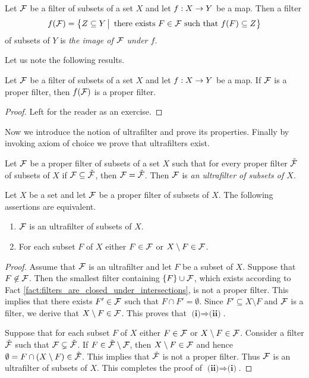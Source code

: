 \begin{definition}
Let ${\mathcal F}$ be a filter of subsets of a set $X$ and let $f:X\rightarrow Y$ be a map. Then a filter
$$f({\mathcal F}) = \big\{Z \subseteq Y\,\big|\,\mbox{ there exists }F\in {\mathcal F}\mbox{ such that }f(F)\subseteq Z\big\}$$
of subsets of $Y$ is \textit{the image of ${\mathcal F}$ under $f$}.
\end{definition}
\noindent
Let us note the following results.

\begin{fact}\label{fact:image_of_a_proper_filter_is_proper}
Let ${\mathcal F}$ be a filter of subsets of a set $X$ and let $f:X\rightarrow Y$ be a map. If ${\mathcal F}$ is a proper filter, then $f({\mathcal F})$ is a proper filter.
\end{fact}
\begin{proof}
Left for the reader as an exercise.
\end{proof}
\noindent
Now we introduce the notion of ultrafilter and prove its properties. Finally by invoking axiom of choice we prove that ultrafilters exist.

\begin{definition}
Let ${\mathcal F}$ be a proper filter of subsets of a set $X$ such that for every proper filter $\tilde{{\mathcal F}}$ of subsets of $X$ if ${\mathcal F} \subseteq \tilde{{\mathcal F}}$, then ${\mathcal F} = \tilde{{\mathcal F}}$. Then ${\mathcal F}$ is \textit{an ultrafilter of subsets of $X$}.
\end{definition}

\begin{proposition}\label{proposition:ultrafilter_contains_either_susbet_or_its_complement}
Let $X$ be a set and let ${\mathcal F}$ be a proper filter of subsets of $X$. The following assertions are equivalent.
\begin{enumerate}[label=\emph{\textbf{(\roman*)}}, leftmargin=*]
\item ${\mathcal F}$ is an ultrafilter of subsets of $X$.
\item For each subset $F$ of $X$ either $F \in {\mathcal F}$ or $X\setminus F \in {\mathcal F}$.
\end{enumerate}
\end{proposition}
\begin{proof}
Assume that ${\mathcal F}$ is an ultrafilter and let $F$ be a subset of $X$. Suppose that $F\not \in {\mathcal F}$. Then the smallest filter containing $\{F\}\cup {\mathcal F}$, which exists according to Fact \ref{fact:filters_are_closed_under_intersections}, is not a proper filter. This implies that there exists $F' \in {\mathcal F}$ such that $F\cap F' = \emptyset$. Since $F'\subseteq X\setminus F$ and ${\mathcal F}$ is a filter, we derive that $X\setminus F \in {\mathcal F}$. This proves that $\textbf{(i)}\Rightarrow \textbf{(ii)}$.

Suppose that for each subset $F$ of $X$ either $F \in {\mathcal F}$ or $X\setminus F \in {\mathcal F}$. Consider a filter $\tilde{{\mathcal F}}$ such that ${\mathcal F} \subsetneq \tilde{{\mathcal F}}$. If $F \in \tilde{{\mathcal F}}\setminus {\mathcal F}$, then $X\setminus F \in {\mathcal F}$ and hence $\emptyset = F\cap \left(X\setminus F\right) \in \tilde{{\mathcal F}}$. This implies that $\tilde{{\mathcal F}}$ is not a proper filter. Thus ${\mathcal F}$ is an ultrafilter of subsets of $X$. This completes the proof of $\textbf{(ii)}\Rightarrow \textbf{(i)}$.
\end{proof}

